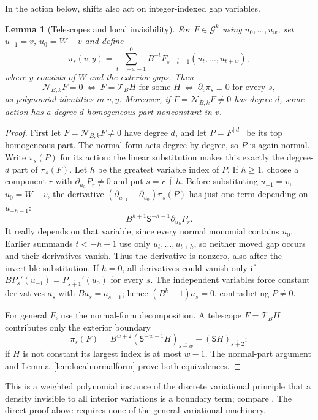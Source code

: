 \documentclass[11pt,a4paper]{article}
\newtheorem{lemma}[theorem]{Lemma}
\begin{document}
In the action below, shifts also act on integer-indexed gap variables.
\begin{lemma}[Telescopes and local invisibility]\label{lem:onepoint}
For $F\in\mathcal G^k$ using $u_0,\ldots,u_w$, set
$u_{-1}=v$, $u_0=W-v$ and define
\begin{equation}\label{eq:localaction}
 \pi_s(v;y)=\sum_{t=-w-1}^{0}B^{-t}
       F_{\overline{s+t+1}}(u_t,\ldots,u_{t+w}),
\end{equation}
where $y$ consists of $W$ and the exterior gaps. Then
\[
 \mathcal N_{B,k}F=0
 \ \Longleftrightarrow\ F=\mathcal T_BH\text{ for some }H
 \ \Longleftrightarrow\ \partial_v\pi_s\equiv0\text{ for every }s,
\]
as polynomial identities in $v,y$.
Moreover, if $F=\mathcal N_{B,k}F\ne0$ has degree $d$, some
action has a degree-$d$ homogeneous part nonconstant in $v$.
\end{lemma}
\begin{proof}
First let $F=\mathcal N_{B,k}F\ne0$ have degree $d$, and let
$P=F^{[d]}$ be its top homogeneous part. The normal form acts degree
by degree, so $P$ is again normal. Write $\pi_s(P)$ for its action:
the linear substitution makes this exactly the degree-$d$ part of
$\pi_s(F)$. Let $h$ be the greatest variable index of $P$.
If $h\ge1$, choose a component $r$ with $\partial_{u_h}P_r\ne0$
and put $s=\overline{r+h}$.
Before substituting $u_{-1}=v$, $u_0=W-v$, the derivative
$(\partial_{u_{-1}}-\partial_{u_0})\pi_s(P)$ has just one term
depending on $u_{-h-1}$:
\[
 B^{h+1}\mathsf S^{-h-1}\partial_{u_h}P_r.
\]
It really depends on that variable, since every normal monomial
contains $u_0$. Earlier summands $t<-h-1$ use only $u_t,\ldots,u_{t+h}$,
so neither moved gap occurs and their derivatives vanish.
Thus the derivative is nonzero,
also after the invertible substitution. If $h=0$, all derivatives
could vanish only if $BP_s'(u_{-1})=P_{\overline{s+1}}'(u_0)$
for every $s$. The independent variables force constant derivatives
$a_s$ with $Ba_s=a_{\overline{s+1}}$; hence $(B^k-1)a_s=0$,
contradicting $P\ne0$.

For general $F$, use the normal-form decomposition. A telescope
$F=\mathcal T_BH$ contributes only the exterior boundary
\[
 \pi_s(F)=B^{w+2}(\mathsf S^{-w-1}H)_{\overline{s-w}}
                     -(\mathsf SH)_{\overline{s+2}};
\]
if $H$ is not constant its largest index is at most $w-1$.
The normal-part argument and Lemma~\ref{lem:localnormalform}
prove both equivalences.
\end{proof}
This is a weighted polynomial instance of the discrete variational
principle that a density invisible to all interior variations is a
boundary term; compare \cite{hydonmansfield}. The direct proof above
requires none of the general variational machinery.
\end{document}
